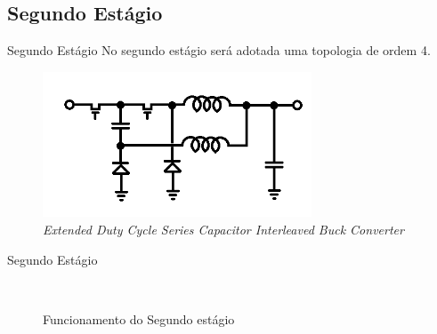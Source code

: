 \documentclass{beamer}
\begin{document}
\subsection{Segundo Estágio}
\begin{frame}{Segundo Estágio}
	No segundo estágio será adotada uma topologia de ordem 4.
	
	\begin{figure}[htb]
		\centering
		\includegraphics[width=8cm]{../../ESQUEMAS/_EDSCIBUCK_PNT.png}
		\caption{\textit{Extended Duty Cycle Series Capacitor Interleaved Buck Converter}}
	\end{figure}
	
\end{frame}
\begin{frame}{Segundo Estágio}
	\begin{figure}[htb]
		\centering
		\mbox{
			\qquad
		}
		\caption{Funcionamento do Segundo estágio}
	\end{figure}
\end{frame}
\end{document}
